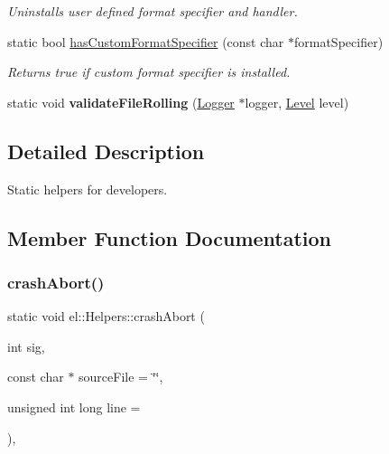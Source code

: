 \begin{DoxyCompactItemize}
\begin{DoxyCompactList}\small\item\em Uninstalls user defined format specifier and handler. \end{DoxyCompactList}\item 
\mbox{\label{classel_1_1_helpers_a154ce041890564d1ae5f87184e24f13d}} 
static bool \hyperlink{classel_1_1_helpers_a154ce041890564d1ae5f87184e24f13d}{has\+Custom\+Format\+Specifier} (const char $\ast$format\+Specifier)
\begin{DoxyCompactList}\small\item\em Returns true if custom format specifier is installed. \end{DoxyCompactList}\item 
\mbox{\label{classel_1_1_helpers_aea3fcde8a07e6f7278574e9563d8ab6b}} 
static void {\bfseries validate\+File\+Rolling} (\hyperlink{classel_1_1_logger}{Logger} $\ast$logger, \hyperlink{namespaceel_ab0ac6091262344c52dd2d3ad099e8e36}{Level} level)
\end{DoxyCompactItemize}


\subsection{Detailed Description}
Static helpers for developers. 

\subsection{Member Function Documentation}
\mbox{\label{classel_1_1_helpers_a6e16f0e07ce40e0659fcfec4ea5b6fe1}} 
\subsubsection{\texorpdfstring{crash\+Abort()}{crashAbort()}}
{\footnotesize\ttfamily static void el\+::\+Helpers\+::crash\+Abort (\begin{DoxyParamCaption}\item[{int}]{sig,  }\item[{const char $\ast$}]{source\+File = {\ttfamily \char`\"{}\char`\"{}},  }\item[{unsigned int long}]{line = {} }\end{DoxyParamCaption})\hspace{0.3cm}{\ttfamily [inline]}, {\ttfamily [static]}}



